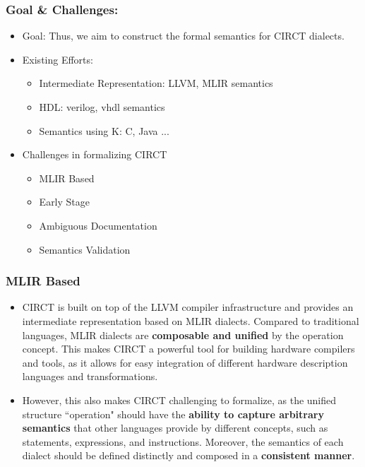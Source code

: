 \documentclass{beamer}
\begin{document}
\begin{frame}
    \frametitle{Goal \& Challenges:}
    \begin{itemize}
        \item Goal: Thus, we aim to construct the formal semantics for CIRCT dialects.
        \item Existing Efforts:
        \begin{itemize}
            \item Intermediate Representation: LLVM, MLIR semantics
            \item HDL: verilog, vhdl semantics
            \item Semantics using K: C, Java ... 
        \end{itemize}
        \item Challenges in formalizing CIRCT
        \begin{itemize}
            \item MLIR Based
            \item Early Stage
            \item Ambiguous Documentation
            \item Semantics Validation
        \end{itemize}
    \end{itemize}
\end{frame}

\begin{frame}
    \frametitle{MLIR Based}
    \begin{itemize}
        \item CIRCT is built on top of the LLVM compiler infrastructure and provides an intermediate representation based on MLIR dialects. Compared to traditional languages, MLIR dialects are \textbf{composable and unified} by the operation concept. This makes CIRCT a powerful tool for building hardware compilers and tools, as it allows for easy integration of different hardware description languages and transformations.
        \item However, this also makes CIRCT challenging to formalize, as the unified structure ``operation" should have the \textbf{ability to capture arbitrary semantics} that other languages provide by different concepts, such as statements, expressions, and instructions. Moreover, the semantics of each dialect should be defined distinctly and composed in a \textbf{consistent manner}.
    \end{itemize}
\end{frame}
\end{document}
